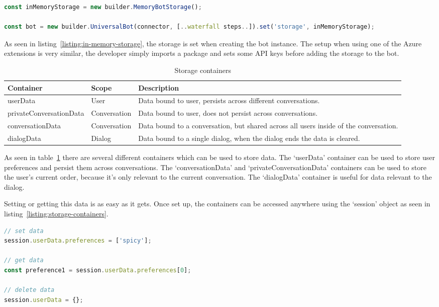 \begin{lstlisting}[language=JavaScript,caption={Example on how to set up the in-memory data storage},label={listing:in-memory-storage}]
const inMemoryStorage = new builder.MemoryBotStorage();

const bot = new builder.UniversalBot(connector, [..waterfall steps..]).set('storage', inMemoryStorage);
\end{lstlisting}

As seen in listing~\ref{listing:in-memory-storage}, the storage is set when creating the bot instance. The setup when using one of the Azure extensions is very similar, the developer simply imports a package and sets some API keys before adding the storage to the bot.

\begin{table}[ht]
	\centering
	\begin{tabular}{p{} | p{} | p{}}
		Container               & Scope        & Description                                                                           \\
		\hline
		userData                & User         & Data bound to user, persists across different conversations.                          \\
		privateConversationData & Conversation & Data bound to user, does not persist across conversations.                            \\
		conversationData        & Conversation & Data bound to a conversation, but shared across all users inside of the conversation. \\
		dialogData              & Dialog       & Data bound to a single dialog, when the dialog ends the data is cleared.
	\end{tabular}
	\caption{Storage containers}
	\label{tab:storage-containers}
\end{table}

As seen in table~\ref{tab:storage-containers} there are several different containers which can be used to store data. The `userData' container can be used to store user preferences and persist them across conversations. The `conversationData' and `privateConversationData' containers can be used to store the user's current order, because it's only relevant to the current conversation. The `dialogData' container is useful for data relevant to the dialog.

Setting or getting this data is as easy as it gets. Once set up, the containers can be accessed anywhere using the `session' object as seen in listing~\ref{listing:storage-containers}.

\newpage

\begin{lstlisting}[language=JavaScript,caption={Example on how to use the storage containers},label={listing:storage-containers}]
// set data
session.userData.preferences = ['spicy']; 

// get data
const preference1 = session.userData.preferences[0];

// delete data
session.userData = {};
\end{lstlisting}
